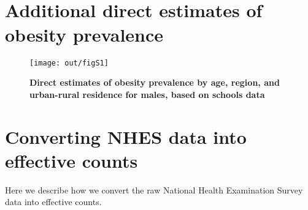 \documentclass[10pt,letterpaper]{article}
\begin{document}
\vspace*{0.2in}

\begin{flushleft}
{\Large
\textbf{} %
}
\newline
\\
\textsuperscript{}\\
\bigskip
\bigskip
\end{flushleft}


\linenumbers

\hypertarget{additional-direct-estimates-of-obesity-prevalence}{%
\section{Additional direct estimates of obesity
prevalence}\label{additional-direct-estimates-of-obesity-prevalence}}

\begin{figure}[h]
\texttt{[image: out/figS1]}
\caption{\textbf{Direct estimates of obesity prevalence by age, region, and urban-rural residence for males, based on schools data}}
\end{figure}

\hypertarget{converting-nhes-data-into-effective-counts}{%
\section{Converting NHES data into effective
counts}\label{converting-nhes-data-into-effective-counts}}

Here we describe how we convert the raw National Health Examination
Survey data into effective counts.
\end{document}
